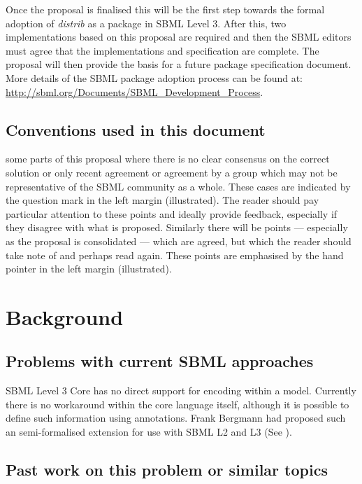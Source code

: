 \documentclass[draftspec]{sbmlpkgspec}
\newcommand{\distribshort}{\emph{distrib}\xspace}
\newcommand{\watchout}{\marginpar{\hspace*{34pt}\raisebox{-0.5ex}{\Large\ding{43}}}}
\newcommand{\controversial}{\marginpar{\hspace*{34pt}\raisebox{-0.5ex}{\Large?}}}
\begin{document}
Once the proposal is finalised this will be the first step towards the
formal adoption of \distribshort as a package in SBML Level
3. After this, two implementations based on this proposal are required
and then the SBML editors must agree that the implementations and specification are complete. The proposal
will then provide the basis for a future package specification
document. More details of the SBML package adoption process can be
found at: \url{http://sbml.org/Documents/SBML_Development_Process}.


\subsection{Conventions used in this document}

 some
parts of this proposal where there is no clear consensus on the
correct solution or only recent agreement or agreement by a group
which may not be representative of the SBML community as a
whole. These cases are indicated by the \controversial question mark
in the left margin (illustrated). The reader should pay particular
attention to these points and ideally provide feedback, especially if
they disagree with what is proposed. Similarly there will be points
--- especially as the proposal is consolidated --- which are agreed,
but which the reader should take note of and perhaps read again. These
points \watchout are emphasised by the hand pointer in the left margin
(illustrated).

\section{Background}

\subsection{Problems with current SBML approaches}

SBML Level 3 Core has no direct support for encoding 
within a model. Currently there is no workaround within the core
language itself, although it is possible to define such information
using annotations. Frank Bergmann had proposed such
an semi-formalised extension for use with SBML L2 and L3 (See ).

\subsection{Past work on this problem or similar topics}
\end{document}
